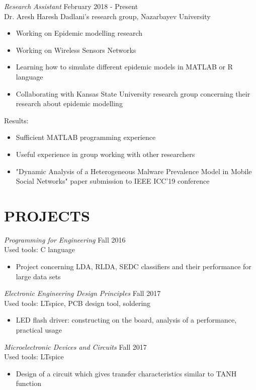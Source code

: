 \documentclass[margin, 10pt]{res} %
\begin{document}
\begin{resume}
{\sl Research Assistant} \hfill February 2018 - Present \\
Dr. Aresh Haresh Dadlani's research group, Nazarbayev University
\begin{itemize}
\item Working on Epidemic modelling research
\item Working on Wireless Sensors Networks
\item Learning how to simulate different epidemic models in MATLAB or R language
\item Collaborating with Kansas State University research group concerning their research about epidemic modelling
\end{itemize} 
Results: 
\begin{itemize}
\item Sufficient MATLAB programming experience
\item Useful experience in group working with other researchers
\item "Dynamic Analysis of a Heterogeneous Malware Prevalence Model in Mobile Social Networks" paper submission to IEEE ICC'19 conference
\end{itemize} 
 
 
\section{PROJECTS}
 
{\sl Programming for Engineering} \hfill Fall 2016 \\
Used tools: C language
\begin{itemize}
\item Project concerning LDA, RLDA, SEDC classifiers and their performance for large data sets
\end{itemize} 

{\sl Electronic Engineering Design Principles} \hfill Fall 2017 \\
Used tools: LTspice, PCB design tool, soldering
\begin{itemize}
\item LED flash driver: constructing on the board, analysis of a performance, practical usage
\end{itemize} 

{\sl Microelectronic Devices and Circuits} \hfill Fall 2017 \\
Used tools: LTspice
\begin{itemize}
\item Design of a circuit which gives transfer characteristics similar to TANH function 
\end{itemize} 


\end{resume}
\end{document}
